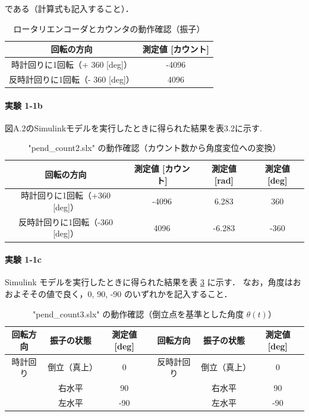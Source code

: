 である（計算式も記入すること）．

\begin{table}[h]
  \centering
  \caption{ロータリエンコーダとカウンタの動作確認（振子）}
  \label{tab:rotation}
  \begin{tabular}{|c|c|}
    \hline
    回転の方向                       & 測定値 [カウント] \\
    \hline
    時計回りに1回転（+ 360 [deg]）   & -4096             \\
    反時計回りに1回転（- 360 [deg]） & 4096              \\
    \hline
  \end{tabular}
\end{table}
\paragraph{実験 1-1b}
図A.2のSimulinkモデルを実行したときに得られた結果を表3.2に示す.

\begin{table}[h]
  \centering
  \caption{"pend\_count2.slx" の動作確認（カウント数から角度変位への変換）}
  \label{tab:pend_count2}
  \begin{tabular}{|c|c|c|c|}
    \hline
    回転の方向                      & 測定値 [カウント] & 測定値 [rad] & 測定値 [deg] \\
    \hline
    時計回りに1回転（+360 [deg]）   & -4096             & 6.283        & 360          \\
    反時計回りに1回転（-360 [deg]） & 4096              & -6.283       & -360         \\
    \hline
  \end{tabular}
\end{table}

\paragraph{実験 1-1c}
Simulink モデルを実行したときに得られた結果を表 \ref{tab:pend_count3} に示す．
なお，角度はおおよそその値で良く，0, 90, -90 のいずれかを記入すること．

\begin{table}[h]
  \centering
  \caption{"pend\_count3.slx" の動作確認（倒立点を基準とした角度 $\theta(t)$）}
  \label{tab:pend_count3}
  \begin{tabular}{|c|c|c|c|c|c|}
    \hline
    回転方向 & 振子の状態   & 測定値 [deg] & 回転方向   & 振子の状態   & 測定値 [deg] \\
    \hline
    時計回り & 倒立（真上） & 0            & 反時計回り & 倒立（真上） & 0            \\
             & 右水平       & 90           &            & 右水平       & 90           \\
             & 左水平       & -90          &            & 左水平       & -90          \\
    \hline
  \end{tabular}
\end{table}


